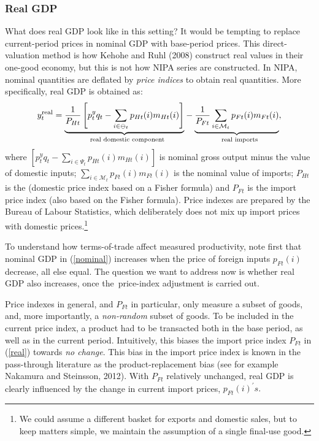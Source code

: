 \documentclass[12pt]{article}
\begin{document}
\subsubsection{Real GDP}

What does real GDP look like in this setting? It would be tempting to
replace current-period prices in nominal GDP with base-period prices. This
direct-valuation method is how Kehohe and Ruhl (2008) construct real values
in their one-good economy, but this is not how NIPA series are constructed.
In NIPA, nominal quantities are deflated by \emph{price indices} to obtain
real quantities. More specifically, real GDP is obtained as: 
\begin{equation}
y_{t}^{\func{real}}=\underset{\text{real domestic component}}{\underbrace{%
\frac{1}{P_{Ht}}\left[ p_{t}^{y}q_{t}-\sum\limits_{i\in \mathcal{\Psi }%
_{t}}p_{Ht}(i)m_{Ht}(i)\right] }}-\underset{\text{real imports}}{\underbrace{%
\frac{1}{P_{Ft}}\sum\limits_{i\in \mathcal{M}_{t}}p_{Ft}(i)m_{Ft}(i)}},
\label{real}
\end{equation}%
where $\left[ p_{t}^{y}q_{t}-\sum\limits_{i\in \mathcal{\Psi }%
_{t}}p_{Ht}(i)m_{Ht}(i)\right] $ is nominal gross output minus the value of
domestic inputs; $\sum\limits_{i\in \mathcal{M}_{t}}p_{Ft}(i)m_{Ft}(i)$ is
the nominal value of imports; $P_{Ht}$ is the (domestic price index based on
a Fisher formula) and $P_{Ft}$ is the import price index (also based on the
Fisher formula). Price indexes are prepared by the Bureau of Labour
Statistics, which deliberately does not mix up import prices with domestic
prices.\footnote{%
We could assume a different basket for exports and domestic sales, but to
keep matters simple, we maintain the assumption of a single final-use good.}

To understand how terms-of-trade affect measured productivity, note first
that nominal GDP in (\ref{nominal}) increases when the price of foreign
inputs $p_{Ft}(i)$ decrease, all else equal. The question we want to address
now is whether real GDP also increases, once the\ price-index adjustment is
carried out.

Price indexes in general, and $P_{Ft}$ in particular, only measure a subset
of goods, and, more importantly, a \emph{non-random} subset of goods. To be
included in the current price index, a product had to be transacted both in
the base period, as well as in the current period. Intuitively, this biases
the import price index $P_{Ft}$ in (\ref{real}) towards \emph{no change}.
This bias in the import price index is known in the pass-through literature
as the product-replacement bias (see for example Nakamura and Steinsson,
2012). With $P_{Ft}$ relatively unchanged, real GDP is clearly influenced by
the change in current import prices, $p_{Ft}(i)^{\prime }s.$
\end{document}
